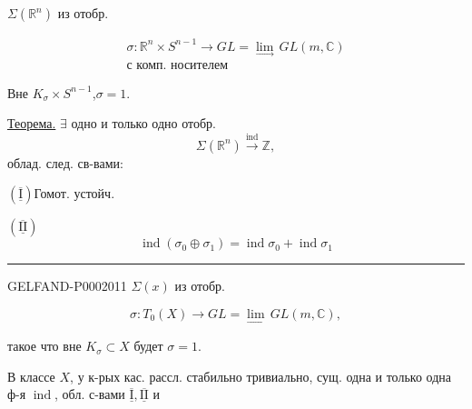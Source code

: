 $\Sigma(\mathbb R^n)$ из отобр.



\begin{gather*}
\sigma\colon\mathbb R^n\times S^{n-1}\longrightarrow GL
=\underset{\longrightarrow}{\lim}\,GL(m,\mathbb C)\\
\text{с комп. носителем}
\end{gather*}



Вне $K_\sigma\times S^{n-1}$,\quad$\sigma=1$.



\Needspace{45mm}
\underline{Теорема.} $\exists$ одно и только одно отобр.
\begin{equation*}\Sigma(\mathbb R^n)\overset{\operatorname{ind}}{\longrightarrow}\mathbb Z,\end{equation*}
облад. след. св-вами:



$(\overline{\underline{\mathrm I}})$\quad Гомот. устойч.



$(\overline{\underline{\mathrm{II}}})$
\begin{equation*}\operatorname{ind}(\sigma_0\oplus\sigma_1)=\operatorname{ind}\sigma_0+\operatorname{ind}\sigma_1\end{equation*}



\par\noindent\rule{\linewidth}{.3pt}\par



\begin{GelfandAdjacentEvidence}{GELFAND-P000201}{1}
$\Sigma(x)$ из отобр.
\end{GelfandAdjacentEvidence}

\begin{equation*}\sigma\colon T_0(X)\longrightarrow GL=\underset{\longrightarrow}{\lim}\,GL(m,\mathbb C),\end{equation*}



такое что вне $K_\sigma\subset X$ будет $\sigma=1$.



В классе $X$, у к-рых кас. рассл. стабильно тривиально,
сущ. одна и только одна ф-я $\operatorname{ind}$, обл. с-вами $\overline{\underline{\mathrm I}},\overline{\underline{\mathrm{II}}}$ и




